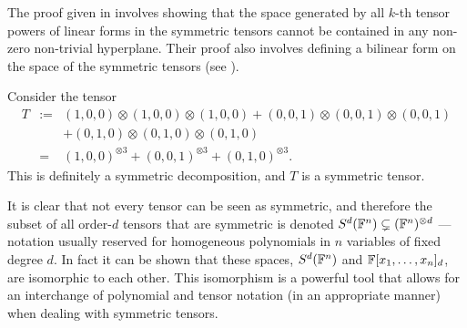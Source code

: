 \documentclass[../Lael_John_MasterThesis_Draft.tex]{subfiles}
\begin{document}
\begin{remark}
    The proof given in \cite{comon_symmetric_2008} involves showing that the space generated by all $k$-th tensor powers of linear forms in the symmetric tensors cannot be contained in any non-zero non-trivial hyperplane. Their proof also involves defining a bilinear form on the space of the symmetric tensors (see ).
\end{remark}
\begin{example}
    Consider the tensor\begin{eqnarray*}
        T &:=& (1,0,0) \otimes (1,0,0) \otimes (1,0,0) + (0,0, 1) \otimes (0,0,1) \otimes (0,0,1)\\ && + (0,1,0) \otimes (0,1,0) \otimes (0,1,0)\\
        &=& (1,0,0)^{\otimes 3} + (0,0, 1)^{\otimes 3} + (0,1,0)^{\otimes 3}.
    \end{eqnarray*} This is definitely a symmetric decomposition, and $T$ is a symmetric tensor.
\end{example}
It is clear that not every tensor can be seen as symmetric, and therefore the subset of all order-$d$ tensors that are symmetric is denoted $S^d(\mathbb{F}^n) \subsetneq (\mathbb{F}^n)^{\otimes d}$ --- notation usually reserved for homogeneous polynomials in $n$ variables of fixed degree $d$. In fact it can be shown that these spaces, $S^d(\mathbb{F}^n)$ and $\mathbb{F}[x_1, \ldots, x_n]_d$, are isomorphic to each other. This isomorphism is a powerful tool that allows for an interchange of polynomial and tensor notation (in an appropriate manner) when dealing with symmetric tensors.
\end{document}
